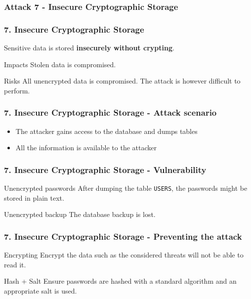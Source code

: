 \subsubsection{Attack 7 - Insecure Cryptographic Storage}

\begin{frame}
\frametitle{7. Insecure Cryptographic Storage}
Sensitive data is stored \textbf{insecurely without crypting}.
\begin{block}{Impacts}
Stolen data is compromised.
\end{block}
\begin{block}{Risks}
All unencrypted \alert{data} is compromised.
The attack is however difficult to perform.
\end{block}
\end{frame}

\begin{frame}
\frametitle{7. Insecure Cryptographic Storage - Attack scenario}
\begin{itemize}
\item The attacker gains access to the database and dumps tables
\item All the information is available to the attacker
\end{itemize}
\end{frame}

\begin{frame}
\frametitle{7. Insecure Cryptographic Storage - Vulnerability}
\begin{exampleblock}{Unencrypted passwords}
After dumping the table \texttt{USERS}, the passwords might be stored in
plain text.
\end{exampleblock}
\begin{exampleblock}{Unencrypted backup}
The database backup is lost.
\end{exampleblock}
\end{frame}

\begin{frame}
\frametitle{7. Insecure Cryptographic Storage - Preventing the attack}
\begin{block}{Encrypting}
Encrypt the data such as the considered threats will not be able to read it.
\end{block}
\begin{block}{Hash + Salt}
Ensure passwords are hashed with a standard algorithm and an appropriate salt
is used.
\end{block}
\end{frame}

